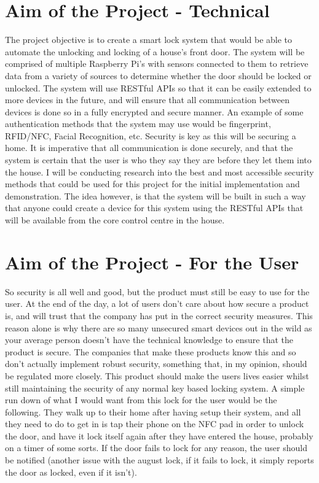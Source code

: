\section{Aim of the Project - Technical}
The project objective is to create a smart lock system that would be able to automate the unlocking and locking of a house's front door. The system will be comprised of multiple Raspberry Pi's with sensors connected to them to retrieve data from a variety of sources to determine whether the door should be locked or unlocked. The system will use RESTful APIs so that it can be easily extended to more devices in the future, and will ensure that all communication between devices is done so in a fully encrypted and secure manner. An example of some authentication methods that the system may use would be fingerprint, RFID/NFC, Facial Recognition, etc.
\newline
\newline
Security is key as this will be securing a home. It is imperative that all communication is done securely, and that the system is certain that the user is who they say they are before they let them into the house. I will be conducting research into the best and most accessible security methods that could be used for this project for the initial implementation and demonstration. The idea however, is that the system will be built in such a way that anyone could create a device for this system using the RESTful APIs that will be available from the core control centre in the house.

\section{Aim of the Project - For the User}
So security is all well and good, but the product must still be easy to use for the user. At the end of the day, a lot of users don't care about how secure a product is, and will trust that the company has put in the correct security measures. This reason alone is why there are so many unsecured smart devices out in the wild as your average person doesn't have the technical knowledge to ensure that the product is secure. The companies that make these products know this and so don't actually implement robust security, something that, in my opinion, should be regulated more closely. This product should make the users lives easier whilst still maintaining the security of any normal key based locking system.
\newline
\newline
A simple run down of what I would want from this lock for the user would be the following. They walk up to their home after having setup their system, and all they need to do to get in is tap their phone on the NFC pad in order to unlock the door, and have it lock itself again after they have entered the house, probably on a timer of some sorts. If the door fails to lock for any reason, the user should be notified (another issue with the august lock, if it fails to lock, it simply reports the door as locked, even if it isn't).


